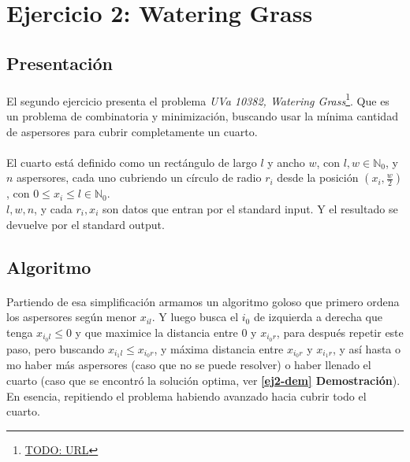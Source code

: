 \documentclass[./main.tex]{subfiles}
\begin{document}
\section{Ejercicio 2: Watering Grass}
\label{sec:ej2}

\subsection{Presentación}
\label{sec:ej2-intro}

\paragraph{} El segundo ejercicio presenta el problema \textit{UVa 10382, Watering Grass}\footnote{\url{TODO: URL}}. Que es un problema de combinatoria y minimización, buscando usar la mínima cantidad de aspersores para cubrir completamente un cuarto.

\paragraph{} El cuarto está definido como un rectángulo de largo \(l\) y ancho \(w\), con \(l, w \in \mathbb{N}_0\), y \(n\) aspersores, cada uno cubriendo un círculo de radio \(r_i\) desde la posición \((x_i, \frac{w}{2})\), con \(0 \leq x_i \leq l \in \mathbb{N}_0\). \\
\(l, w, n\), y cada \(r_i, x_i\) son datos que entran por el standard input. Y el resultado se devuelve por el standard output.

\subsection{Algoritmo}
\label{sec:ej2-algo}


\paragraph{} Partiendo de esa simplificación armamos un algoritmo goloso que primero ordena los aspersores según menor \(x_{il}\). Y luego busca el \(i_0\) de izquierda a derecha que tenga \(x_{i_0l} \leq 0\) y que maximice la distancia entre 0 y \(x_{i_0r}\), para después repetir este paso, pero buscando \(x_{i_1l} \leq x_{i_0r}\), y máxima distancia entre \(x_{i_0r}\) y \(x_{i_1r}\), y así hasta o mo haber más aspersores (caso que no se puede resolver) o haber llenado el cuarto (caso que se encontró la solución optima, ver \textbf{\ref{ej2-dem} Demostración}). \\
En esencia, repitiendo el problema habiendo avanzado hacia cubrir todo el cuarto.
\end{document}
